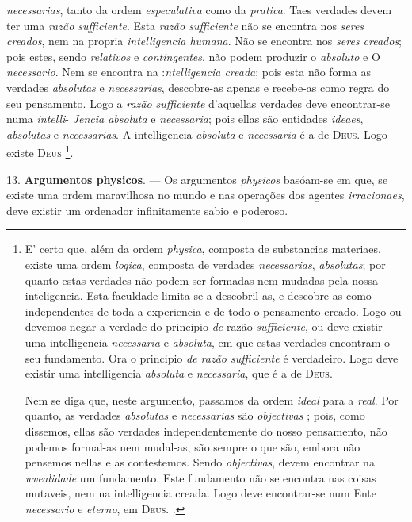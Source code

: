 \emph{necessarias}, tanto da ordem \emph{especulativa} como da \emph{pratica}. Taes verdades devem ter uma \emph{razão sufficiente}. Esta \emph{razão sufficiente} não se encontra nos \emph{seres creados}, nem na propria \emph{intelligencia humana}. Não se encontra nos \emph{seres creados}; pois estes, sendo \emph{relativos} e \emph{contingentes}, não podem produzir o \emph{absoluto} e O   \emph{necessario}. Nem se encontra na :\emph{ntelligencia creada}; pois esta não forma as verdades \emph{absolutas} e \emph{necessarias}, descobre-as apenas e recebe-as como regra do seu pensamento. Logo a \emph{razão sufficiente} d'aquellas verdades deve encontrar-se numa \emph{intelli}- \emph{Jencia absoluta} e \emph{necessaria}; pois ellas são entidades \emph{ideaes}, \emph{absolutas} e \emph{necessarias}. A intelligencia \emph{absoluta} e \emph{necessaria} é a de \textsc{Deus}. Logo existe \textsc{Deus} \footnote{E' certo que, além da ordem \emph{physica}, composta de substancias materiaes, existe uma ordem \emph{logica}, composta de verdades \emph{necessarias}, \emph{absolutas}; por quanto estas verdades não podem ser formadas nem mudadas pela nossa inteligencia. Esta faculdade limita-se a descobril-as, e descobre-as como independentes de toda a experiencia e de todo o pensamento creado. Logo ou devemos negar a verdade do principio \emph{de} razão \emph{sufficiente}, ou deve existir uma intelligencia \emph{necessaria} e \emph{absoluta}, em que estas verdades encontram o seu fundamento. Ora o principio \emph{de razão sufficiente} é verdadeiro. Logo deve existir uma intelligencia \emph{absoluta} e \emph{necessaria}, que é a de \textsc{Deus}.\par Nem se diga que, neste argumento, passamos da ordem \emph{ideal} para a \emph{real}. Por quanto, as verdades \emph{absolutas} e \emph{necessarias} são \emph{objectivas} ; pois, como dissemos, ellas são verdades independentemente do nosso pensamento, não podemos formal-as nem mudal-as, são sempre o que são, embora não pensemos nellas e as contestemos. Sendo \emph{objectivas}, devem encontrar na \emph{wvealidade} um fundamento. Este fundamento não se encontra nas coisas mutaveis, nem na intelligencia creada. Logo deve encontrar-se num Ente \emph{necessario} e \emph{eterno}, em \textsc{Deus}. :}.

13. \textbf{Argumentos physicos}. --- Os argumentos \emph{physicos} basóam-se em que, se existe uma ordem maravilhosa no mundo e nas operações dos agentes \emph{irracionaes}, deve existir um ordenador infinitamente sabio e poderoso.

